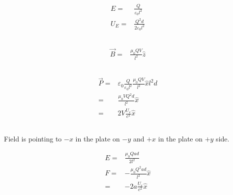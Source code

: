 \documentclass[10pt,fleqn]{article}
\newcommand{\eqar}[1]
{
  \begin{align*}
    #1
  \end{align*}
}
\begin{document}
\subsection{}
\eqar{
  E=&\frac{Q}{\varepsilon_0l^2}\\
  U_E=&\frac{Q^2d}{2\varepsilon_0l^2}
}
\subsection{}
\eqar{
  \vec B=&\frac{\mu_0 Q V}{l^2}\hat z
}
\subsection{}
\eqar{
  \vec P=&\varepsilon_0\frac{Q}{\varepsilon_0l^2}\frac{\mu_0 Q V}{l^2}\hat x l^2d\\
  =&\frac{\mu_0 VQ^2d}{l^2}\hat x\\
  =&2V\frac{U_e}{c^2}\hat x
}
\subsection{}
Field is pointing to $-x$ in the plate on $-y$ and $+x$ in the plate on $+y$ side.
\eqar{
  E=&\frac{\mu_0 Q a d}{2l^2}\\
  F=&-\frac{\mu_0 Q^2 a d}{l^2}\hat x\\
  =&-2 a\frac{U_e}{c^2}\hat x
}
\end{document}
